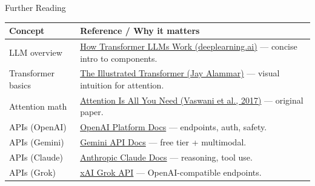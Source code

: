 \documentclass[aspectratio=169]{beamer}
\begin{document}
\begin{frame}{Further Reading}
  \vspace{-0.4em}
  \begin{tabular}{@{}p{3.8cm}p{7.8cm}@{}}
    \toprule
    \textbf{Concept} & \textbf{Reference / Why it matters} \\
    \midrule
    LLM overview & \href{https://learn.deeplearning.ai/courses/how-transformer-llms-work}{How Transformer LLMs Work (deeplearning.ai)} — concise intro to components. \\
    Transformer basics & \href{https://jalammar.github.io/illustrated-transformer/}{The Illustrated Transformer (Jay Alammar)} — visual intuition for attention. \\
    Attention math & \href{https://arxiv.org/abs/1706.03762}{Attention Is All You Need (Vaswani et al., 2017)} — original paper. \\
    APIs (OpenAI) & \href{https://platform.openai.com/docs}{OpenAI Platform Docs} — endpoints, auth, safety. \\
    APIs (Gemini) & \href{https://ai.google.dev/gemini-api/docs}{Gemini API Docs} — free tier + multimodal. \\
    APIs (Claude) & \href{https://docs.anthropic.com}{Anthropic Claude Docs} — reasoning, tool use. \\
    APIs (Grok) & \href{https://x.ai/api}{xAI Grok API} — OpenAI-compatible endpoints. \\
     \bottomrule
  \end{tabular}
\end{frame}
\end{document}
